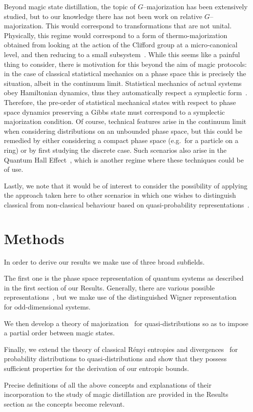 \documentclass[
onecolumn,
superscriptaddress
]{revtex4-1}
\newcommand{\revhigh}[1]{{\color{red}#1}}
\begin{document}
Beyond magic state distillation, the topic of $G$--majorization has been extensively studied, but to our knowledge there has not been work on relative $G$--majorization. This would correspond to transformations that are not unital. Physically, this regime would correspond to a form of thermo-majorization obtained from looking at the action of the Clifford group at a micro-canonical level, and then reducing to a small subsystem~\cite{Pathria_1997}. While this seems like a painful thing to consider, there is motivation for this beyond the aim of magic protocols: in the case of classical statistical mechanics on a phase space this is precisely the situation, albeit in the continuum limit. Statistical mechanics of actual systems obey Hamiltonian dynamics, thus they automatically respect a symplectic form~\cite{Arnold_2000, Pathria_1997}. Therefore, the pre-order of statistical mechanical states with respect to phase space dynamics preserving a Gibbs state must correspond to a symplectic majorization condition. Of course, technical features arise in the continuum limit when considering distributions on an unbounded phase space, but this could be remedied by either considering a compact phase space (e.g.~for a particle on a ring) or by first studying the discrete case. Such scenarios also arise in the Quantum Hall Effect~\cite{Klitzing_1980}, which is another regime where these techniques could be of use.

Lastly, we note that it would be of interest to consider the possibility of applying the approach taken here to other scenarios in which one wishes to distinguish classical from non-classical behaviour based on quasi-probability representations~\cite{Ferrie_2008, barnett_1997,Allahverdyan_2018, arvidsson_2020, halpern_2018, Lostaglio_2018, Levy_2020}.

\revhigh{
\section*{Methods}

In order to derive our results we make use of three broad subfields.

The first one is the phase space representation of quantum systems as described in the first section of our Results.
Generally, there are various possible representations~\cite{Ferrie_2008}, but we make use of the distinguished Wigner representation~\cite{Gross2006} for odd-dimensional systems.

We then develop a theory of majorization~\cite{cit:marshall,  Veinott_1971, Ruch_1976} for quasi-distributions so as to impose a partial order between magic states.

Finally, we extend the theory of classical R\'{e}nyi entropies and divergences~\cite{renyi_1960} for probability distributions to quasi-distributions and show that they possess sufficient properties for the derivation of our entropic bounds. 

Precise definitions of all the above concepts and explanations of their incorporation to the study of magic distillation are provided in the Results section as the concepts become relevant.
}
\end{document}
